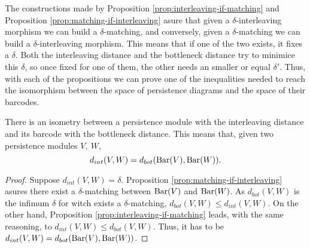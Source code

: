 The constructions made by Proposition \ref{prop:interleaving-if-matching} and Proposition \ref{prop:matching-if-interleaving} asure that given a $\delta$-interleaving morphism we can build a $\delta$-matching, and conversely, given a $\delta$-matching we can build a $\delta$-interleaving morphism. This means that if one of the two exists, it fixes a $\delta$. Both the interleaving distance and the bottleneck distance try to minimice this $\delta$, so once fixed for one of them, the other needs an smaller or equal $\delta'$. Thus, with each of the propositions we can prove one of the inequalities needed to reach the isomorphism between the space of persistence diagrams and the space of their barcodes.

\begin{theorem}[Stability] \cite[Theorem 2.2.8]{polterovich}
    There is an isometry between a persistence module with the interleaving distance and its barcode with the bottleneck distance. This means that, given two persistence modules $ V, \ W $, 
    $$ 
        d_{int} (V, W) = d_{bot} (\operatorname{Bar}(V), \operatorname{Bar}(W)).
    $$
\end{theorem}
\begin{proof}
    Suppose $ d_{int}(V, W) = \delta $. Proposition \ref{prop:matching-if-interleaving} asures there exist a $\delta$-matching between $ \operatorname{Bar}(V) $ and $ \operatorname{Bar} (W) $. As $ d_{bot}(V, W) $ is the infimum $\delta$ for witch exists a $\delta$-matching, $ d_{bot}(V, W) \leq d_{int}(V, W)$. On the other hand, Proposition \ref{prop:interleaving-if-matching} leads, with the same reasoning, to $ d_{int}(V, W) \leq d_{bot}(V, W)$. Thus, it has to be $ d_{int} (V, W) = d_{bot} (\operatorname{Bar}(V), \operatorname{Bar}(W)) $.
\end{proof}
